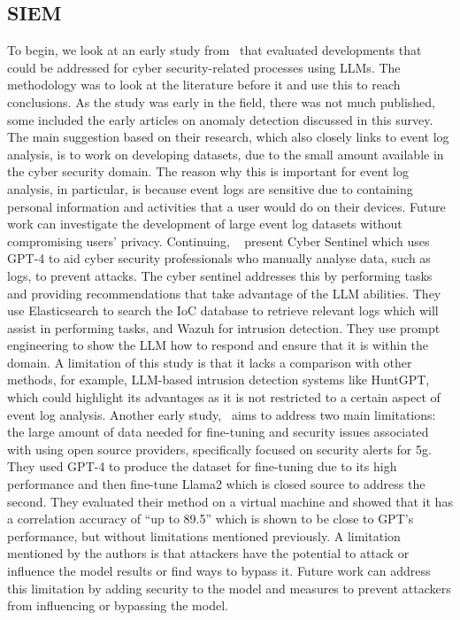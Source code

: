 \subsection{SIEM}
To begin, we look at an early study from~\cite{sultana2023towards} that evaluated developments that could be addressed for cyber security-related processes using LLMs. The methodology was to look at the literature before it and use this to reach conclusions. As the study was early in the field, there was not much published, some included the early articles on anomaly detection discussed in this survey. The main suggestion based on their research, which also closely links to event log analysis, is to work on developing datasets, due to the small amount available in the cyber security domain. The reason why this is important for event log analysis, in particular, is because event logs are sensitive due to containing personal information and activities that a user would do on their devices. Future work can investigate the development of large event log datasets without compromising users' privacy. Continuing, ~\cite{kaheh2023cyber} present Cyber Sentinel which uses GPT-4 to aid cyber security professionals who manually analyse data, such as logs, to prevent attacks. The cyber sentinel addresses this by performing tasks and providing recommendations that take advantage of the LLM abilities. They use Elasticsearch to search the IoC database to retrieve relevant logs which will assist in performing tasks, and Wazuh for intrusion detection. They use prompt engineering to show the LLM how to respond and ensure that it is within the domain. A limitation of this study is that it lacks a comparison with other methods, for example, LLM-based intrusion detection systems like HuntGPT, which could highlight its advantages as it is not restricted to a certain aspect of event log analysis. Another early study,~\cite{yao20235g} aims to address two main limitations: the large amount of data needed for fine-tuning and security issues associated with using open source providers, specifically focused on security alerts for 5g. They used GPT-4 to produce the dataset for fine-tuning due to its high performance and then fine-tune Llama2 which is closed source to address the second. They evaluated their method on a virtual machine and showed that it has a correlation accuracy of ``up to 89.5'' which is shown to be close to GPT's performance, but without limitations mentioned previously. A limitation mentioned by the authors is that attackers have the potential to attack or influence the model results or find ways to bypass it. Future work can address this limitation by adding security to the model and measures to prevent attackers from influencing or bypassing the model.

